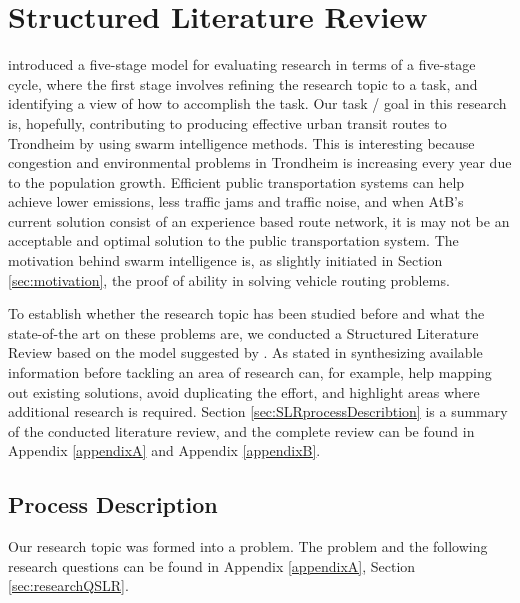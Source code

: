 \section{Structured Literature Review}
\label{sec:structuredLiteratureReview}

\citet{cohen88} introduced a five-stage model for evaluating research in terms of a five-stage cycle, where the first stage involves refining the research topic to a task, and identifying a view of how to accomplish the task. Our task / goal in this research is, hopefully, contributing to producing effective urban transit routes to Trondheim by using swarm intelligence methods. This is interesting because congestion and environmental problems in Trondheim is increasing every year due to the population growth\citep{website:miljopakken}. Efficient public transportation systems can help achieve lower emissions, less traffic jams and traffic noise, and when AtB's\citet{website:atb} current solution consist of an experience based route network, it is may not be an acceptable and optimal solution to the public transportation system. The motivation behind swarm intelligence is, as slightly initiated in Section \vref{sec:motivation}, the proof of ability in solving vehicle routing problems. 

To establish whether the research topic has been studied before and what the state-of-the art on these problems are, we conducted a Structured Literature Review based on the model suggested by \citet{kofod2014}. As stated in \citep{kofod2014} synthesizing available information before tackling an area of research can, for example, help mapping out existing solutions, avoid duplicating the effort, and highlight areas where additional research is required. Section \vref{sec:SLRprocessDescribtion} is a summary of the conducted literature review, and the complete review can be found in Appendix \vref{appendixA} and Appendix \vref{appendixB}. 


\subsection{Process Description}
\label{sec:SLRprocessDescribtion}

Our research topic was formed into a problem. The problem and the following research questions can be found in Appendix \ref{appendixA}, Section \vref{sec:researchQSLR}.

